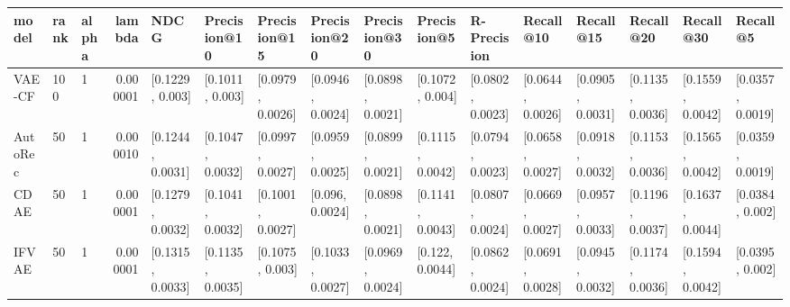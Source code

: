 \begin{tabular}{lllrllllllllllll}
\toprule
   model & rank & alpha &    lambda &              NDCG &      Precision@10 &      Precision@15 &      Precision@20 &      Precision@30 &       Precision@5 &       R-Precision &         Recall@10 &         Recall@15 &         Recall@20 &         Recall@30 &          Recall@5 \\
\midrule
  VAE-CF &  100 &     1 &  0.000001 &   [0.1229, 0.003] &   [0.1011, 0.003] &  [0.0979, 0.0026] &  [0.0946, 0.0024] &  [0.0898, 0.0021] &   [0.1072, 0.004] &  [0.0802, 0.0023] &  [0.0644, 0.0026] &  [0.0905, 0.0031] &  [0.1135, 0.0036] &  [0.1559, 0.0042] &  [0.0357, 0.0019] \\
 AutoRec &   50 &     1 &  0.000010 &  [0.1244, 0.0031] &  [0.1047, 0.0032] &  [0.0997, 0.0027] &  [0.0959, 0.0025] &  [0.0899, 0.0021] &  [0.1115, 0.0042] &  [0.0794, 0.0023] &  [0.0658, 0.0027] &  [0.0918, 0.0032] &  [0.1153, 0.0036] &  [0.1565, 0.0042] &  [0.0359, 0.0019] \\
    CDAE &   50 &     1 &  0.000001 &  [0.1279, 0.0032] &  [0.1041, 0.0032] &  [0.1001, 0.0027] &   [0.096, 0.0024] &  [0.0898, 0.0021] &  [0.1141, 0.0043] &  [0.0807, 0.0024] &  [0.0669, 0.0027] &  [0.0957, 0.0033] &  [0.1196, 0.0037] &  [0.1637, 0.0044] &   [0.0384, 0.002] \\
   IFVAE &   50 &     1 &  0.000001 &  [0.1315, 0.0033] &  [0.1135, 0.0035] &   [0.1075, 0.003] &  [0.1033, 0.0027] &  [0.0969, 0.0024] &   [0.122, 0.0044] &  [0.0862, 0.0024] &  [0.0691, 0.0028] &  [0.0945, 0.0032] &  [0.1174, 0.0036] &  [0.1594, 0.0042] &   [0.0395, 0.002] \\
\bottomrule
\end{tabular}
